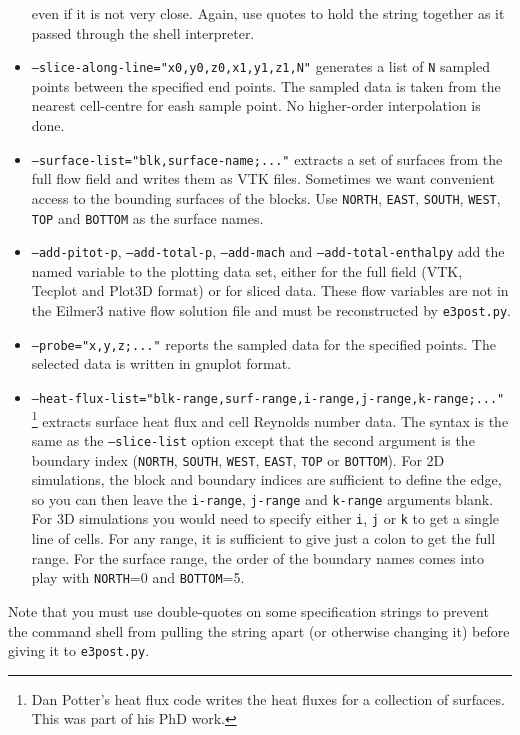\begin{itemize}
     even if it is not very close.
     Again, use quotes to hold the string together as it passed through the shell interpreter.
  \item \texttt{--slice-along-line="x0,y0,z0,x1,y1,z1,N"} generates a list of \texttt{N} sampled points between
     the specified end points.
     The sampled data is taken from the nearest cell-centre for eash sample point.
     No higher-order interpolation is done.
  \item \texttt{--surface-list="blk,surface-name;..."} extracts a set of surfaces from the full flow field and 
     writes them as VTK files.  
     Sometimes we want convenient access to the bounding surfaces of the blocks.
     Use \texttt{NORTH}, \texttt{EAST}, \texttt{SOUTH}, \texttt{WEST}, \texttt{TOP} and \texttt{BOTTOM} 
     as the surface names.
  \item \texttt{--add-pitot-p}, \texttt{--add-total-p}, \texttt{--add-mach} and \texttt{--add-total-enthalpy} add the
     named variable to the plotting data set, either for the full field (VTK, Tecplot and Plot3D format) or for sliced data.
     These flow variables are not in the Eilmer3 native flow solution file and must be reconstructed by \texttt{e3post.py}.
  \item \texttt{--probe="x,y,z;..."} reports the sampled data for the specified points.
     The selected data is written in gnuplot format.
  \item \texttt{--heat-flux-list="blk-range,surf-range,i-range,j-range,k-range;..."}\,\footnote{Dan Potter's heat flux code writes
     the heat fluxes for a collection of surfaces.  This was part of his PhD work.} extracts surface heat flux and cell Reynolds number data.
     The syntax is the same as the \texttt{--slice-list} option except that the second argument is the boundary index 
     (\texttt{NORTH}, \texttt{SOUTH}, \texttt{WEST}, \texttt{EAST}, \texttt{TOP} or \texttt{BOTTOM}).
     For 2D simulations, the block and boundary indices are sufficient to define the edge, 
     so you can then leave the \texttt{i-range}, \texttt{j-range} and \texttt{k-range} arguments blank.
     For 3D simulations you would need to specify either \texttt{i}, \texttt{j} or \texttt{k} to get a single line of cells.
     For any range, it is sufficient to give just a colon to get the full range.
     For the surface range, the order of the boundary names comes into play with \texttt{NORTH}=0 and \texttt{BOTTOM}=5.
\end{itemize}
Note that you must use double-quotes on some specification strings to prevent the command shell 
from pulling the string apart (or otherwise changing it) before giving it to \texttt{e3post.py}.

